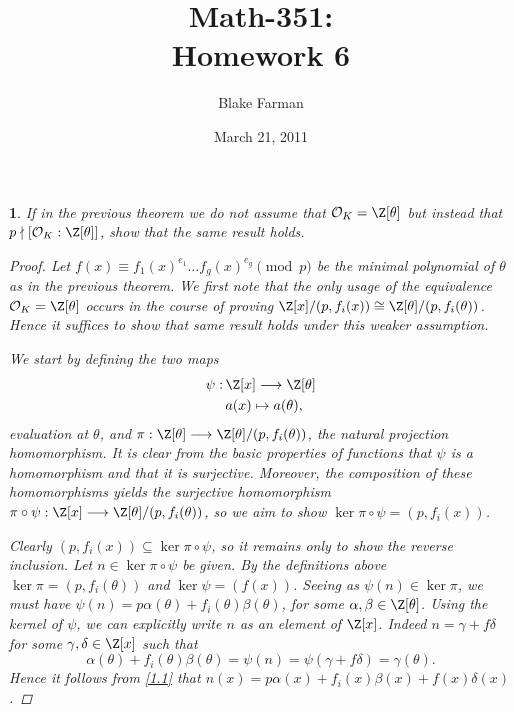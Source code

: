 \documentclass[10pt]{amsart}
\author{Blake Farman}
\title{Math-351:\\Homework 6}
\date{March 21, 2011}
\begin{document}
\maketitle

\newtheorem{thm}{}

\newcommand{\OO}{\mathcal{O}}

\begin{thm}
  \label{Ex1}
  If in the previous theorem we do not assume that $\OO_K = \Z[\theta]$ but instead that $p \nmid [\OO_K : \Z[\theta]]$, show that the same result holds.
  \begin{proof}
    Let $f(x) \equiv f_1(x)^{e_1}\ldots f_g(x)^{e_g} \pmod{p}$ be the minimal polynomial of $\theta$ as in the previous theorem.
    We first note that the only usage of the equivalence $\OO_K = \Z[\theta]$ occurs in the course of proving $\Z[x]/(p,f_i(x)) \cong \Z[\theta]/(p,f_i(\theta))$.
    Hence it suffices to show that same result holds under this weaker assumption.
    
    We start by defining the two maps
  \begin{align*}
    \begin{split}
      \psi:\,& \Z[x] \longrightarrow \Z[\theta]\\
      &a(x) \mapsto a(\theta),
    \end{split}
  \end{align*}
  evaluation at $\theta$, and $\pi: \Z[\theta] \longrightarrow \Z[\theta]/(p,f_i(\theta))$, the natural projection homomorphism.  
  It is clear from the basic properties of functions that $\psi$ is a homomorphism and that it is surjective.
  Moreover, the composition of these homomorphisms yields the surjective homomorphism $\pi \circ \psi: \Z[x] \longrightarrow \Z[\theta]/(p,f_i(\theta))$, so we aim to show $\ker{\pi \circ \psi} = (p,f_i(x))$.
  
  Clearly $(p, f_i(x)) \subseteq \ker{\pi \circ \psi}$, so it remains only to show the reverse inclusion.
  Let $n \in \ker{\pi \circ \psi}$ be given.
  By the definitions above $\ker{\pi} = (p, f_i(\theta))$ and $\ker{\psi} = (f(x))$.
  Seeing as $\psi(n) \in \ker{\pi}$, we must have $\psi(n) = p\alpha(\theta) + f_i(\theta)\beta(\theta)$, for some $\alpha,\beta \in \Z[\theta]$.
  Using the kernel of $\psi$, we can explicitly write $n$ as an element of $\Z[x]$.
  Indeed $n = \gamma + f\delta$ for some $\gamma,\delta \in \Z[x]$ such that 
  \begin{equation}
    \label{1.1}
     \alpha(\theta) + f_i(\theta)\beta(\theta) = \psi(n) = \psi(\gamma + f\delta) = \gamma(\theta).
  \end{equation}
  Hence it follows from \eqref{1.1} that $n(x) = p\alpha(x) + f_i(x)\beta(x) + f(x)\delta(x)$.
  

\end{proof}
\end{thm}
\end{document}
